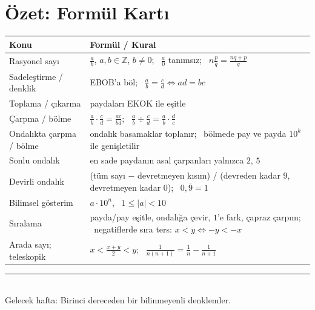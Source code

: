 \documentclass[11pt,a4paper]{article}
\newcounter{alis}
\newcommand{\ab}[1]{\overline{#1}}
\begin{document}
\section{Özet: Formül Kartı}
\begin{center}\footnotesize
\renewcommand{\arraystretch}{1.1}
\begin{tabular}{@{}l p{}@{}}
\toprule
Konu & Formül / Kural\\\midrule
Rasyonel sayı & \(\frac{a}{b}\), \(a,b\in\mathbb{Z}\), \(b\neq 0\); \ \(\frac{a}{0}\) tanımsız; \ \(n\frac{p}{q}=\frac{nq+p}{q}\)\\
Sadeleştirme / denklik & EBOB'a böl; \ \(\frac{a}{b}=\frac{c}{d}\iff ad=bc\)\\
Toplama / çıkarma & paydaları EKOK ile eşitle\\
Çarpma / bölme & \(\frac{a}{b}\cdot\frac{c}{d}=\frac{ac}{bd}\); \ \(\frac{a}{b}\div\frac{c}{d}=\frac{a}{b}\cdot\frac{d}{c}\)\\
Ondalıkta çarpma / bölme & ondalık basamaklar toplanır; \ bölmede pay ve payda \(10^{k}\) ile genişletilir\\
Sonlu ondalık & en sade paydanın asal çarpanları yalnızca \(2\), \(5\)\\
Devirli ondalık & (tüm sayı \(-\) devretmeyen kısım) / (devreden kadar \(9\), devretmeyen kadar \(0\)); \ \(0{,}\ab{9}=1\)\\
Bilimsel gösterim & \(a\cdot 10^{n}\), \ \(1\le|a|<10\)\\
Sıralama & payda/pay eşitle, ondalığa çevir, \(1\)'e fark, çapraz çarpım; \ negatiflerde sıra ters: \(x<y\iff -y<-x\)\\
Arada sayı; teleskopik & \(x<\frac{x+y}{2}<y\); \ \(\frac{1}{n(n+1)}=\frac{1}{n}-\frac{1}{n+1}\)\\\bottomrule
\end{tabular}
\end{center}

\newpage


\vspace{6pt}
\noindent\textcolor{anamavi}{\rule{\textwidth}{0.5pt}}\\
{\small Gelecek hafta: Birinci dereceden bir bilinmeyenli denklemler.}
\end{document}
